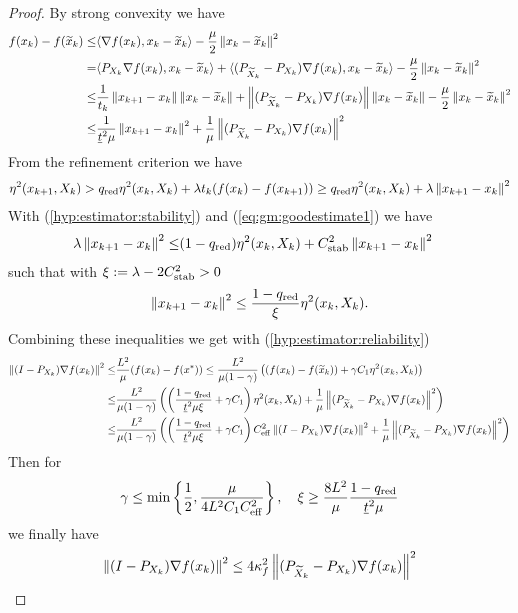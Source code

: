\begin{proof}
By strong convexity  we have 
%
\begin{align*}
f(x_k) - f(\widetilde{x}_k) \le& \langle\nabla f(x_k),x_k-\widetilde{x}_k\rangle - \frac{\mu}{2}\left\|x_k-\widetilde{x}_k\right\|^2\\
=& \langle P_{X_k}\nabla f(x_k),x_k-\widetilde{x}_k\rangle + \langle(P_{\widetilde{X}_k}-P_{X_k})\nabla f(x_k),x_k-\widetilde{x}_k\rangle- \frac{\mu}{2}\left\|x_k-\widetilde{x}_k\right\|^2\\
\le& \frac{1}{t_k}\left\|x_{k+1}-x_k\right\|\left\|x_k-\widetilde{x}_k\right\| + \left\|(P_{\widetilde{X}_k}-P_{X_k})\nabla f(x_k)\right\|\left\|x_k-\widetilde{x}_k\right\|- \frac{\mu}{2}\left\|x_k-\widetilde{x}_k\right\|^2\\
\le&\frac{1}{\underline{t}^2\mu}\left\|x_{k+1}-x_k\right\|^2 + \frac{1}{\mu} \left\|(P_{\widetilde{X}_k}-P_{X_k})\nabla f(x_k)\right\|^2
\end{align*}
%
From the refinement criterion we have
%
\begin{align*}
\eta^2(x_{k+1}, X_{k})> q_{\rm red}\eta^2(x_{k}, X_{k}) + \lambda t_{k}(f(x_{k})-f(x_{k+1}))\ge
q_{\rm red}\eta^2(x_{k}, X_{k}) + \lambda \left\|x_{k+1}-x_k\right\|^2
\end{align*}
%
With (\ref{hyp:estimator:stability}) and (\ref{eq:gm:goodestimate1}) we have
%
\begin{align*}
\lambda \left\|x_{k+1}-x_k\right\|^2 \le& (1-q_{\rm red})\eta^2(x_{k}, X_{k}) + C_{\rm stab}^2\left\|x_{k+1}-x_k\right\|^2
\end{align*}
%
such that with $\xi := \lambda -  2C_{\rm stab}^2 >0$
%
\begin{align*}
\left\|x_{k+1}-x_k\right\|^2 \le \frac{1-q_{\rm red}}{\xi}\eta^2(x_{k}, X_{k}).
\end{align*}
%
%
Combining these inequalities we get with (\ref{hyp:estimator:reliability})
%
\begin{align*}
\left\|(I-P_{X_k})\nabla f(x_k)\right\|^2 \le& \frac{L^2}{\mu} (f(x_k) - f(x^*))
\le \frac{L^2 }{\mu(1-\gamma)} \left( (f(x_k) - f(\widetilde{x}_k)) + \gamma C_1\eta^2(x_k,X_k)\right)\\
\le&  \frac{L^2 }{\mu(1-\gamma)} \left( \left( \frac{1-q_{\rm red}}{\underline{t}^2\mu\xi}+ \gamma C_1\right)\eta^2(x_{k}, X_{k}) + \frac{1}{\mu} \left\|(P_{\widetilde{X}_k}-P_{X_k})\nabla f(x_k)\right\|^2 \right)\\
\le&  \frac{L^2 }{\mu(1-\gamma)} \left( \left( \frac{1-q_{\rm red}}{\underline{t}^2\mu\xi}+ \gamma C_1\right)C_{\rm eff}^2\left\|(I-P_{X_k})\nabla f(x_k)\right\|^2 + \frac{1}{\mu} \left\|(P_{\widetilde{X}_k}-P_{X_k})\nabla f(x_k)\right\|^2 \right)
\end{align*}
%
Then for 
%
\begin{align*}
\gamma \le \min\left\{\frac12,\frac{\mu}{4L^2 C_1 C_{\rm eff}^2}\right\},\quad
\xi \ge \frac{8L^2 }{\mu} \frac{1-q_{\rm red}}{\underline{t}^2\mu} 
\end{align*}
%
we finally have
%
\begin{align*}
\left\|(I-P_{X_k})\nabla f(x_k)\right\|^2 \le  4\kappa_f^2\left\|(P_{\widetilde{X}_k}-P_{X_k})\nabla f(x_k)\right\|^2
\end{align*}
%


\end{proof}
%
